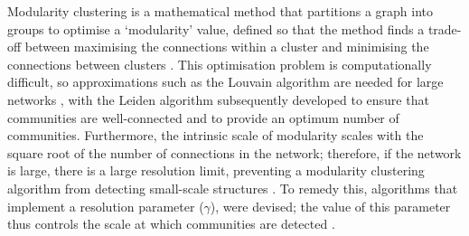 Modularity clustering is a mathematical method that partitions a graph into groups to optimise a `modularity' value, defined so that the method finds a trade-off between maximising the connections within a cluster and minimising the connections between clusters \parencite{newmanModularityCommunityStructure2006}.
This optimisation problem is computationally difficult, so approximations such as the Louvain algorithm are needed for large networks \parencite{blondelFastUnfoldingCommunities2008}, with the Leiden algorithm \parencite{traagLouvainLeidenGuaranteeing2019} subsequently developed to ensure that communities are well-connected and to provide an optimum number of communities.
Furthermore, the intrinsic scale of modularity scales with the square root of the number of connections in the network; therefore, if the network is large, there is a large resolution limit, preventing a modularity clustering algorithm from detecting small-scale structures \parencite{fortunatoResolutionLimitCommunity2007,traagNarrowScopeResolutionlimitfree2011}.
To remedy this, algorithms that implement a resolution parameter ($\gamma$), were devised; the value of this parameter thus controls the scale at which communities are detected \parencite{reichardtDetectingFuzzyCommunity2004,kumpulaLimitedResolutionComplex2007}.

